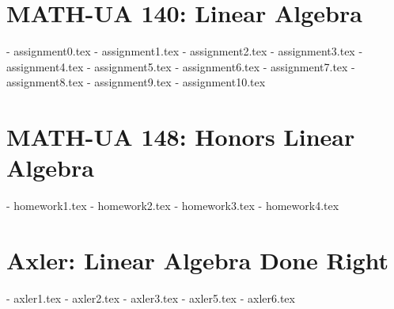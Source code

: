 \section{MATH-UA 140: Linear Algebra}
- assignment0.tex
- assignment1.tex
- assignment2.tex
- assignment3.tex
- assignment4.tex
- assignment5.tex
- assignment6.tex
- assignment7.tex
- assignment8.tex
- assignment9.tex
- assignment10.tex

\section{MATH-UA 148: Honors Linear Algebra}
- homework1.tex
- homework2.tex
- homework3.tex
- homework4.tex

\section{Axler: Linear Algebra Done Right}
- axler1.tex     %
- axler2.tex     %
- axler3.tex     %
- axler5.tex     %
- axler6.tex     %
